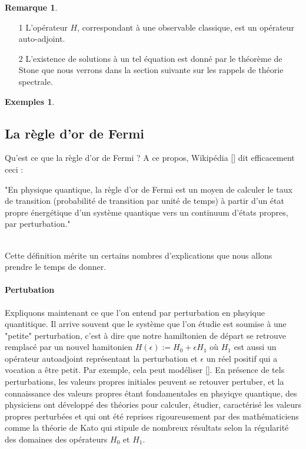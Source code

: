 \documentclass[12pt,openany,a4paper, titlepage]{article}
\theoremstyle{definition}
\theoremstyle{definition}
\theoremstyle{definition}
\theoremstyle{definition}
\newtheorem{exs}{Exemples}
\theoremstyle{definition}
\newtheorem{rem}{Remarque}
\theoremstyle{definition}
\begin{document}
\begin{rem}
    \begin{enumerate}
        \item[1] L'opérateur $H$, correspondant à une observable classique, est un opérateur auto-adjoint.
        \item[2] L'existence de solutions à un tel équation est donné par le théorème de Stone que nous verrons dans la section suivante sur les rappels de théorie spectrale.
    \end{enumerate}
\end{rem}

\begin{exs}
    
\end{exs}

\subsection{La règle d'or de Fermi} 

Qu'est ce que la règle d'or de Fermi ? A ce propos, Wikipédia [] dit efficacement ceci : \\

\begin{it}
    "En physique quantique, la règle d'or de Fermi est un moyen de calculer le taux de transition (probabilité de transition par unité de temps) à partir d'un état propre énergétique d'un système quantique vers un continuum d'états propres, par perturbation."
\end{it}\\

Cette définition mérite un certains nombres d'explications que nous allons  prendre le temps de donner. 



\paragraph{Pertubation}
Expliquons maintenant ce que l'on entend par perturbation en phsyique quantitique. Il arrive souvent que le système que l'on étudie est soumise à une "petite" perturbation, c'est à dire que notre hamiltonien de départ se retrouve remplacé par un nouvel hamitonien $H(\epsilon) := H_0 + \epsilon H_1$ où $H_1$ est aussi un opérateur autoadjoint représentant la perturbation et $\epsilon$ un réel positif qui a vocation a être petit.  Par exemple, cela peut modéliser []. En présence de tels perturbations, les valeurs propres initiales peuvent se retouver pertuber, et la connaissance des valeurs propres étant fondamentales en phsyiqye quantique, des physiciens ont développé des théories pour calculer, étudier, caractérisé les valeurs propres perturbées et qui ont été reprises rigoureusement par des mathématiciens comme la théorie de Kato qui stipule de nombreux résultats selon la régularité des domaines des opérateurs $H_0$ et $H_1$. 
\end{document}

